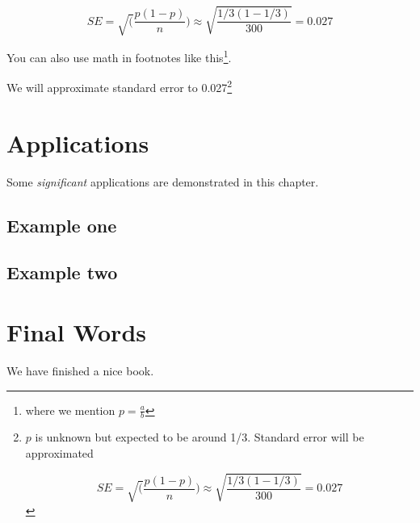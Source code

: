 \documentclass[
]{book}
\begin{document}
\[
SE = \sqrt(\frac{p(1-p)}{n}) \approx \sqrt{\frac{1/3 (1 - 1/3)} {300}} = 0.027
\]

You can also use math in footnotes like this\footnote{where we mention \(p = \frac{a}{b}\)}.

We will approximate standard error to 0.027\footnote{\(p\) is unknown but expected to be around 1/3. Standard error will be approximated

  \[
  SE = \sqrt(\frac{p(1-p)}{n}) \approx \sqrt{\frac{1/3 (1 - 1/3)} {300}} = 0.027
  \]}

\hypertarget{applications}{%
\chapter{Applications}\label{applications}}

Some \emph{significant} applications are demonstrated in this chapter.

\hypertarget{example-one}{%
\section{Example one}\label{example-one}}

\hypertarget{example-two}{%
\section{Example two}\label{example-two}}

\hypertarget{final-words}{%
\chapter{Final Words}\label{final-words}}

We have finished a nice book.

  
\end{document}
